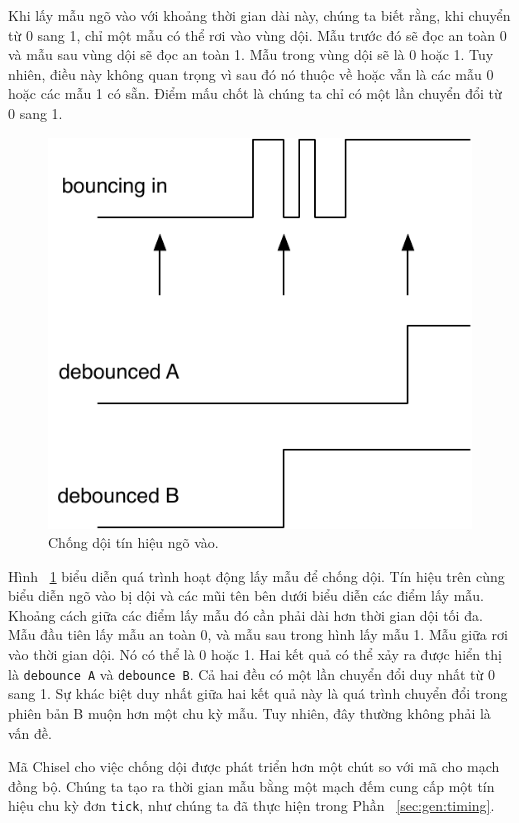 \documentclass[%
    10pt,
    headinclude, footexclude,
    openright, %
    notitlepage,
    cleardoubleempty,
    headsepline,
    pointlessnumbers,
    bibtotoc, idxtotoc,
    ]{scrbook}
\newcommand{\code}[1]{{\small{\texttt{#1}}}}
\newcommand{\scale}{0.7}
\begin{document}
Khi lấy mẫu ngõ vào với khoảng thời gian dài này, chúng ta biết rằng, khi chuyển từ 0 sang 1, chỉ một mẫu có thể rơi vào vùng dội. Mẫu trước đó sẽ đọc an toàn 0 và mẫu sau vùng dội sẽ đọc an toàn 1. Mẫu trong vùng dội sẽ là 0 hoặc 1. Tuy nhiên, điều này không quan trọng vì sau đó nó thuộc về hoặc vẫn là các mẫu 0 hoặc các mẫu 1 có sẵn. Điểm mấu chốt là chúng ta chỉ có một lần chuyển đổi từ 0 sang 1. 

\begin{figure}
  \centering
  \includegraphics[scale=\scale]{figures/debounce}
  \caption{Chống dội tín hiệu ngõ vào.}
  \label{fig:debounce}
\end{figure}

Hình ~\ref{fig:debounce} biểu diễn quá trình hoạt động lấy mẫu để chống dội. Tín hiệu trên cùng biểu diễn ngõ vào bị dội và các mũi tên bên dưới biểu diễn các điểm lấy mẫu. Khoảng cách giữa các điểm lấy mẫu đó cần phải dài hơn thời gian dội tối đa. Mẫu đầu tiên lấy mẫu an toàn 0, và mẫu sau trong hình lấy mẫu 1. Mẫu giữa rơi vào thời gian dội. Nó có thể là 0 hoặc 1. Hai kết quả có thể xảy ra được hiển thị là \code{debounce A} và \code{debounce B}. Cả hai đều có một lần chuyển đổi duy nhất từ 0 sang 1. Sự khác biệt duy nhất giữa hai kết quả này là quá trình chuyển đổi trong phiên bản B muộn hơn một chu kỳ mẫu. Tuy nhiên, đây thường không phải là vấn đề.

Mã Chisel cho việc chống dội được phát triển hơn một chút so với mã cho mạch đồng bộ. Chúng ta tạo ra thời gian mẫu bằng một mạch đếm cung cấp một tín hiệu chu kỳ đơn \code{tick}, như chúng ta đã thực hiện trong Phần ~\ref{sec:gen:timing}. 
\end{document}
